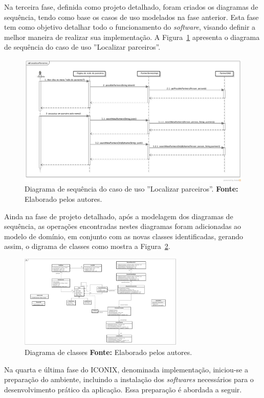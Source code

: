 \par Na terceira fase, definida como projeto detalhado, foram criados os diagramas de sequência, tendo como base os casos de uso modelados na fase anterior. Esta fase tem como objetivo detalhar todo o funcionamento do \textit{software}, visando definir a melhor maneira de realizar sua implementação. A Figura~\ref{fig:diagrama_sequencia_localizar_parceiros} apresenta o diagrama de sequência do caso de uso ''Localizar parceiros''.

\newpage
\begin{figure}[h!]
	\centerline{\includegraphics[angle=90,scale=0.4]{./imagens/apendices/diagrama-sequencia-localizar-parceiros.png}}
	\caption[Diagrama de sequência do caso de uso ''Localizar parceiros'']
	{Diagrama de sequência do caso de uso ''Localizar parceiros''. \textbf{Fonte:} Elaborado pelos autores.}
	\label{fig:diagrama_sequencia_localizar_parceiros}
\end{figure}

\par Ainda na fase de projeto detalhado, após a modelagem dos diagramas de sequência, as operações encontradas nestes diagramas foram adicionadas ao modelo de domínio, em conjunto com as novas classes identificadas, gerando assim, o digrama de classes como mostra a Figura~\ref{fig:diagrama_classe}.

\begin{figure}[h!]
	\centerline{\includegraphics[angle=90,height=0.7\textheight,width=0.7\textwidth]{./imagens/classe.jpg}}
	\caption[Diagrama de classes]
	{Diagrama de classes \textbf{Fonte:} Elaborado pelos autores.}
	\label{fig:diagrama_classe}
\end{figure}

\newpage
\par Na quarta e última fase do ICONIX, denominada implementação, iniciou-se a preparação do ambiente, incluindo a instalação dos \textit{softwares} necessários para o desenvolvimento prático da aplicação. Essa preparação é abordada a seguir.

